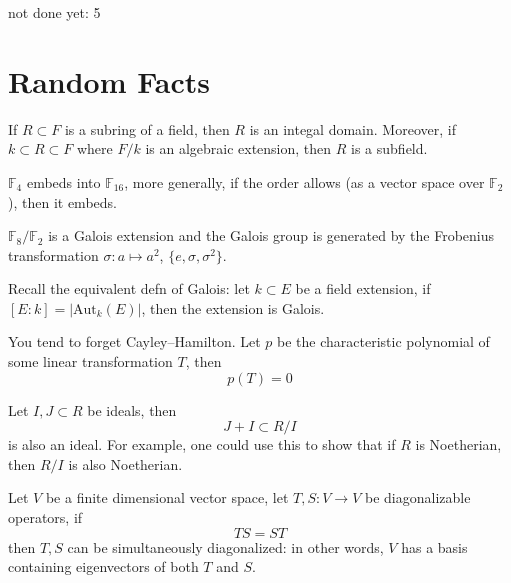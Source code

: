 \documentclass[openany]{book}
\newcommand{\F}{\mathbb{F}}
\begin{document}
not done yet: 5





\chapter{Random Facts}

\begin{prop}
    If $R\subset F$ is a subring of a field, then $R$ is an integal domain. Moreover, if $k\subset R\subset F$ where $F/k$ is an algebraic extension, then $R$ is a subfield.
\end{prop}

\begin{prop}
    $\F_4$ embeds into $\F_{16}$, more generally, if the order allows (as a vector space over $\F_2$), then it embeds.
\end{prop}

\begin{prop}
    $\F_8/\F_2$ is a Galois extension and the Galois group is generated by the Frobenius transformation $\sigma: a\mapsto a^2$, $\{e, \sigma, \sigma^2\}$.

    Recall the equivalent defn of Galois: let $k\subset E$ be a field extension, if $[E: k]=|\text{Aut}_k(E)|$, then the extension is Galois.
\end{prop}

\begin{prop}
    You tend to forget Cayley--Hamilton. Let $p$ be the characteristic polynomial of some linear transformation $T$, then 
    \begin{equation*}
        p(T)=0
    \end{equation*}
\end{prop}


\begin{prop}
    Let $I,J\subset R$ be ideals, then 
    \begin{equation*}
        J+I\subset R/I
    \end{equation*}
    is also an ideal. For example, one could use this to show that if $R$ is Noetherian, then $R/I$ is also Noetherian.
\end{prop}


\begin{prop}
    Let $V$ be a finite dimensional vector space, let $T,S: V\to V$ be diagonalizable operators, if 
    \begin{equation*}
        TS=ST
    \end{equation*}
    then $T,S$ can be simultaneously diagonalized: in other words, $V$ has a basis containing eigenvectors of both $T$ and $S$.
\end{prop}
\end{document}
